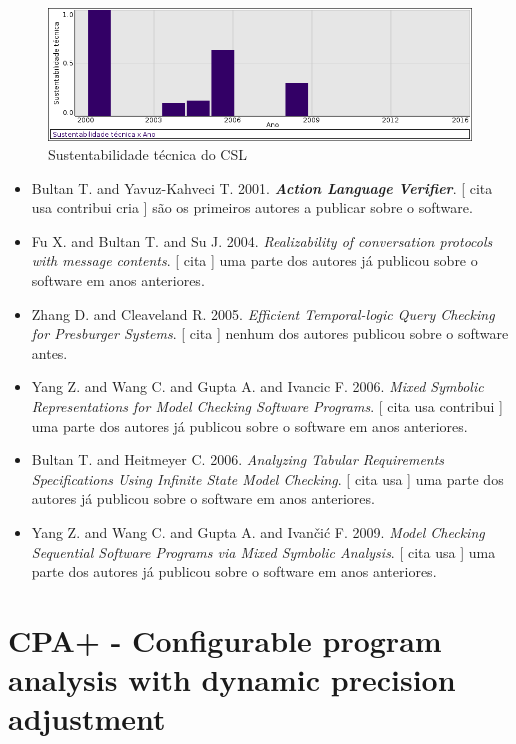 \begin{figure}[h]
  \center
  \includegraphics[scale=0.50]{result-documents/charts/composite.png}
  \caption{Sustentabilidade técnica do CSL}
\end{figure}


\begin{itemize}
\item Bultan T. and Yavuz-Kahveci T.
      2001.
        \textbf{\textit{ Action Language Verifier}}.
      [
          cita
          usa
          contribui
          cria
      ]
são os primeiros autores a publicar sobre o software.
\item Fu X. and Bultan T. and Su J.
      2004.
        \textit{ Realizability of conversation protocols with message contents}.
      [
          cita
      ]
uma parte dos autores já publicou sobre o software em anos anteriores.
\item Zhang D. and Cleaveland R.
      2005.
        \textit{ Efficient Temporal-logic Query Checking for Presburger Systems}.
      [
          cita
      ]
nenhum dos autores publicou sobre o software antes.
\item Yang Z. and Wang C. and Gupta A. and Ivancic F.
      2006.
        \textit{ Mixed Symbolic Representations for Model Checking Software Programs}.
      [
          cita
          usa
          contribui
      ]
uma parte dos autores já publicou sobre o software em anos anteriores.
\item Bultan T. and Heitmeyer C.
      2006.
        \textit{ Analyzing Tabular Requirements Specifications Using Infinite State Model Checking}.
      [
          cita
          usa
      ]
uma parte dos autores já publicou sobre o software em anos anteriores.
\item Yang Z. and Wang C. and Gupta A. and Ivan\v{c}i\'{c} F.
      2009.
        \textit{ Model Checking Sequential Software Programs via Mixed Symbolic Analysis}.
      [
          cita
          usa
      ]
uma parte dos autores já publicou sobre o software em anos anteriores.
\end{itemize}
\section{CPA+ - Configurable program analysis with dynamic precision adjustment}

